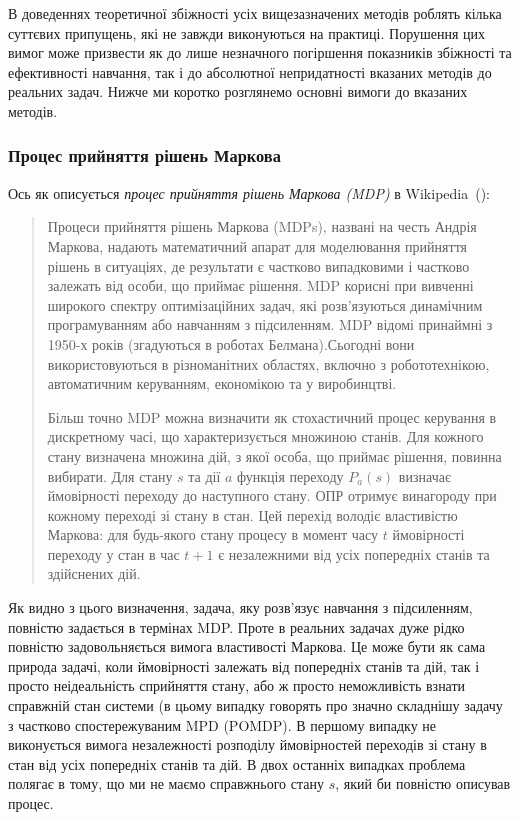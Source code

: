 \documentclass[a4paper,10pt,fleqn]{article}
\begin{document}
В доведеннях теоретичної збіжності усіх вищезазначених методів роблять кілька суттєвих припущень, які не завжди виконуються на практиці. Порушення цих вимог може призвести як до лише незначного погіршення показників збіжності та ефективності навчання, так і до абсолютної непридатності вказаних методів до реальних задач. Нижче ми коротко розглянемо основні вимоги до вказаних методів.

\subsubsection{Процес прийняття рішень Маркова}

Ось як описується \emph{процес прийняття рішень Маркова (MDP)} в Wikipedia~(\cite{WikiMDP}):
\begin{quotation}
	Процеси прийняття рішень Маркова (MDPs), названі на честь Андрія Маркова, надають математичний апарат для моделювання прийняття рішень в ситуаціях, де результати є частково випадковими і частково залежать від особи, що приймає рішення. MDP корисні при вивченні широкого спектру оптимізаційних задач, які розв'язуються динамічним програмуванням або навчанням з підсиленням. MDP відомі принаймні з 1950-х років (згадуються в роботах Белмана).Сьогодні вони використовуються в різноманітних областях, включно з робототехнікою, автоматичним керуванням, економікою та у виробинцтві.

	Більш точно MDP можна визначити як стохастичний процес керування в дискретному часі, що характеризується множиною станів. Для кожного стану визначена множина дій, з якої особа, що приймає рішення, повинна вибирати. Для стану $s$ та дії $a$ функція переходу $P_a(s)$ визначає ймовірності переходу до наступного стану. ОПР отримує винагороду при кожному переході зі стану в стан. Цей перехід володіє властивістю Маркова: для будь-якого стану процесу в момент часу $t$ ймовірності переходу у стан в час $t+1$ є незалежними від усіх попередніх станів та здійснених дій.
\end{quotation}

Як видно з цього визначення, задача, яку розв'язує навчання з підсиленням, повністю задається в термінах MDP. Проте в реальних задачах дуже рідко повністю задовольняється вимога властивості Маркова. Це може бути як сама природа задачі, коли ймовірності залежать від попередніх станів та дій, так і просто неідеальність сприйняття стану, або ж просто неможливість взнати справжній стан системи (в цьому випадку говорять про значно складнішу задачу з частково спостережуваним MPD (POMDP). В першому випадку не виконується вимога незалежності розподілу ймовірностей переходів зі стану в стан від усіх попередніх станів та дій. В двох останніх випадках проблема полягає в тому, що ми не маємо справжнього стану $s$, який би повністю описував процес.
\end{document}
